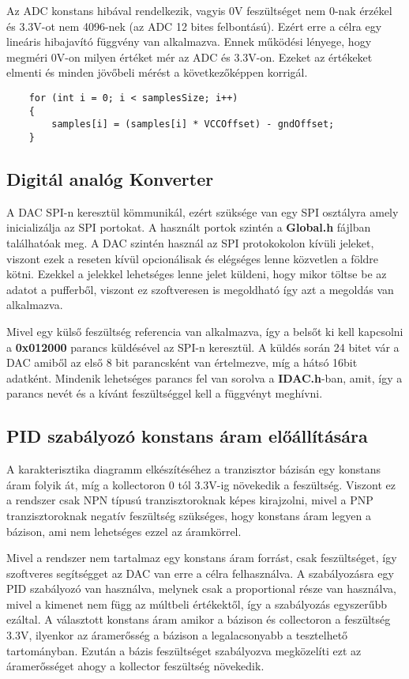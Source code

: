 Az ADC konstans hibával rendelkezik, vagyis 0V feszültséget nem 0-nak érzékel
és 3.3V-ot nem 4096-nek (az ADC 12 bites felbontású). Ezért erre a célra egy
lineáris hibajavító függvény van alkalmazva. Ennek működési lényege, hogy
megméri 0V-on milyen értéket mér az ADC és 3.3V-on. Ezeket az értékeket elmenti
és minden jövőbeli mérést a következőképpen korrigál.


\begin{lstlisting}
    for (int i = 0; i < samplesSize; i++)
    {
        samples[i] = (samples[i] * VCCOffset) - gndOffset;
    }
\end{lstlisting}

\subsection{Digitál analóg Konverter}

A DAC SPI-n keresztül kömmunikál, ezért
szüksége van egy SPI osztályra amely inicializálja az 
SPI portokat. A használt portok szintén a \textbf{Global.h}
fájlban találhatóak meg. A DAC szintén használ az SPI protokokolon
kívüli jeleket, viszont ezek a reseten kívül opcionálisak és 
elégséges lenne közvetlen a földre kötni. Ezekkel a jelekkel
lehetséges lenne jelet küldeni, hogy mikor töltse be az adatot
a pufferből, viszont ez szoftveresen is megoldható így azt a megoldás
van alkalmazva.

Mivel egy külső feszültség referencia van alkalmazva, így a belsőt
ki kell kapcsolni a \textbf{0x012000} parancs küldésével az SPI-n keresztül.
A küldés során 24 bitet vár a DAC amiből az első 8 bit parancsként
van értelmezve, míg a hátsó 16bit adatként. Mindenik lehetséges parancs
fel van sorolva a \textbf{IDAC.h}-ban, amit, így a parancs nevét és a 
kívánt feszültséggel kell a függvényt meghívni.

\subsection{PID szabályozó konstans áram előállítására}

A karakterisztika diagramm elkészítéséhez a tranzisztor bázisán egy konstans áram
folyik át, míg a kollectoron 0 tól 3.3V-ig növekedik a feszültség. Viszont
ez a rendszer csak NPN típusú tranzisztoroknak képes kirajzolni, mivel a
PNP tranzisztoroknak negatív feszültség szükséges, hogy konstans áram legyen
a bázison, ami nem lehetséges ezzel az áramkörrel.

Mivel a rendszer nem tartalmaz egy konstans áram forrást, csak feszültséget,
így szoftveres segítségget az DAC van erre a célra felhasználva. A 
szabályozásra egy PID szabályozó van használva, melynek csak a proportional
része van használva, mivel a kimenet nem függ az múltbeli értékektől,
így a szabályozás egyszerűbb ezáltal. A választott konstans áram 
amikor a bázison és collectoron a feszültség 3.3V, ilyenkor az
áramerősség a bázison a legalacsonyabb a tesztelhető tartományban.
Ezután a bázis feszültséget szabályozva megközelíti ezt az áramerősséget
ahogy a kollector feszültség növekedik.

